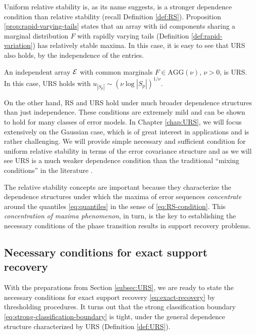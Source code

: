 Uniform relative stability is, as its name suggests, is a stronger dependence condition than relative stability (recall 
Definition \ref{def:RS}).  Proposition \ref{prop:rapid-varying-tails} states that an array with iid components sharing 
a marginal distribution $F$ with rapidly varying tails (Definition  \ref{def:rapid-variation}) has relatively stable maxima. 
In this case, it is easy to see that URS also holds, by the independence of the entries.

\begin{corollary} \label{cor:AGG-is-URS}
An independent array ${\cal E}$ with common marginals $F\in\text{AGG}(\nu)$, $\nu>0$, is URS.  
In this case, URS holds with $u_{|S_p|} \sim \left(\nu\log{|S_p|}\right)^{1/\nu}$.
\end{corollary}

On the other hand, RS and URS hold under much broader dependence structures than just 
independence.  These conditions are extremely mild and can be shown to hold for many classes of error models.  
In Chapter \ref{chap:URS}, we will focus extensively on the Gaussian case, which is of great interest in applications 
and is rather challenging.  We will provide simple necessary and sufficient condition for uniform relative stability in 
terms of the error covariance structure and as we will see URS is a much weaker dependence condition than the traditional
``mixing conditions'' in the literature \citep[see][for more insights]{leadbetter2012extremes}.

The relative stability concepts are important because they characterize the dependence structures under which the maxima of error sequences {\em concentrate} around the quantiles \eqref{eq:quantiles} in the sense of \eqref{eq:RS-condition}.
This {\em concentration of maxima phenomenon}, in turn, is the key to establishing the necessary conditions of the phase transition results in support recovery problems.


\subsection{Necessary conditions for exact support recovery}
\label{subsec:necessary}

With the preparations from Section \ref{subsec:URS}, we are ready to state the necessary conditions for exact support recovery \eqref{eq:exact-recovery} by thresholding procedures. 
It turns out that the strong classification boundary \eqref{eq:strong-classification-boundary} is tight, under the general dependence structure characterized by URS (Definition \ref{def:URS}).

